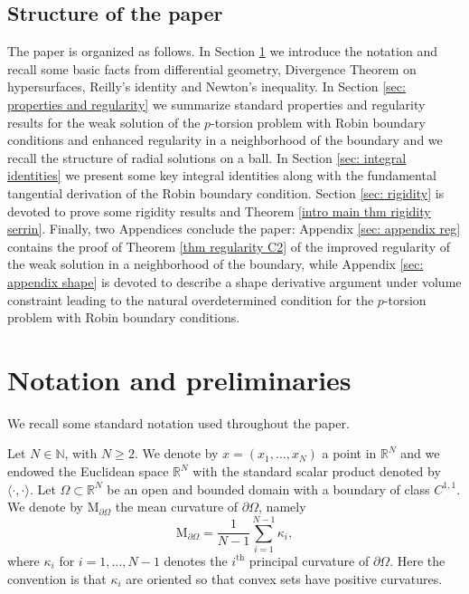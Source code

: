 \documentclass[10pt,a4paper, reqno]{amsart}
\numberwithin{equation}{section}
\newcommand{\R}{\mathbb{R}}
\newcommand{\N}{\mathbb{N}}
\begin{document}
\subsection{Structure of the paper}
The paper is organized as follows. In Section \ref{sec: notation} we introduce the notation and recall some basic facts from differential geometry, Divergence Theorem on hypersurfaces, Reilly's identity and Newton's inequality. In Section \ref{sec: properties and regularity} we summarize standard properties and regularity results for the weak solution of the $p$-torsion problem with Robin boundary conditions and enhanced regularity in a neighborhood of the boundary and we recall the structure of radial solutions on a ball. In Section \ref{sec: integral identities} we present some key integral identities along with the fundamental tangential derivation of the Robin boundary condition. Section \ref{sec: rigidity} is devoted to prove some rigidity results and Theorem \ref{intro main thm rigidity serrin}. Finally, two Appendices conclude the paper: Appendix \ref{sec: appendix reg} contains the proof of Theorem \ref{thm regularity C2} of the improved regularity of the weak solution in a neighborhood of the boundary, while Appendix \ref{sec: appendix shape} is devoted to describe a shape derivative argument under volume constraint leading to the natural overdetermined condition for the $p$-torsion problem with Robin boundary conditions.
 
\section{Notation and preliminaries} \label{sec: notation}

We recall some standard notation used throughout the paper. 

Let $N \in \N $, with $N\ge 2$. We denote by $x = (x_1,\dots,x_N)$ a point in $\R^N$ and we endowed the Euclidean space $\R^N$ with the standard scalar product denoted by $\langle \cdot,\cdot \rangle$. Let $\Omega \subset \R^N$ be an open and bounded domain with a boundary of class $C^{1,1}$. We denote by $\mathrm{M}_{\partial\Omega}$ the mean curvature of $\partial \Omega$, namely
\[
\mathrm{M}_{\partial\Omega}=\frac{1}{N-1} \sum_{i=1}^{N-1} \kappa_i,
\]
where $\kappa_i$ for $i=1, \dots,N-1$ denotes the $i^{\text{th}}$ principal curvature of $\partial \Omega$. Here the convention is that $\kappa_i$ are oriented so that convex sets have positive curvatures.
\end{document}
